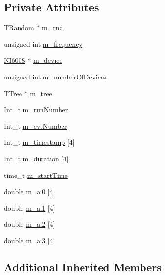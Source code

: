 \subsection*{Private Attributes}
\begin{DoxyCompactItemize}
\item 
T\+Random $\ast$ \hyperlink{classCurrentMeasurement_ac0c595b78b8110a19b59a333a6c27c1b}{m\+\_\+rnd}
\item 
unsigned int \hyperlink{classCurrentMeasurement_a66e12903825632c0434e3b7cf929a960}{m\+\_\+frequency}
\item 
\hyperlink{classNI6008}{N\+I6008} $\ast$ \hyperlink{classCurrentMeasurement_a7df157175089da57bd020b8680e87f80}{m\+\_\+device}
\item 
unsigned int \hyperlink{classCurrentMeasurement_a073f6aba41750712d620e60e346f2315}{m\+\_\+number\+Of\+Devices}
\item 
T\+Tree $\ast$ \hyperlink{classCurrentMeasurement_a559823413932b393dedfc62d42268d93}{m\+\_\+tree}
\item 
Int\+\_\+t \hyperlink{classCurrentMeasurement_a5a7bfe59821148e4e9e2998c73b635a8}{m\+\_\+run\+Number}
\item 
Int\+\_\+t \hyperlink{classCurrentMeasurement_a6e01f96c84aec986de9a9f7393ccb2c6}{m\+\_\+evt\+Number}
\item 
Int\+\_\+t \hyperlink{classCurrentMeasurement_acc9f2cabf165e47a9fbf2a357e424cef}{m\+\_\+timestamp} \mbox{[}4\mbox{]}
\item 
Int\+\_\+t \hyperlink{classCurrentMeasurement_ad08307f13d37c05e1a4e42ff39c97911}{m\+\_\+duration} \mbox{[}4\mbox{]}
\item 
time\+\_\+t \hyperlink{classCurrentMeasurement_abd5a7612f08721143623add96797a433}{m\+\_\+start\+Time}
\item 
double \hyperlink{classCurrentMeasurement_a793b1467b6a5388361340d41f9e8833f}{m\+\_\+ai0} \mbox{[}4\mbox{]}
\item 
double \hyperlink{classCurrentMeasurement_aeef18708be94b89de9c4384dd452207d}{m\+\_\+ai1} \mbox{[}4\mbox{]}
\item 
double \hyperlink{classCurrentMeasurement_a27ce0cfd8d1c04f6cd4d8de0403fafba}{m\+\_\+ai2} \mbox{[}4\mbox{]}
\item 
double \hyperlink{classCurrentMeasurement_aa1223e4b36335ceb507edd12d4cfa8ad}{m\+\_\+ai3} \mbox{[}4\mbox{]}
\end{DoxyCompactItemize}
\subsection*{Additional Inherited Members}


